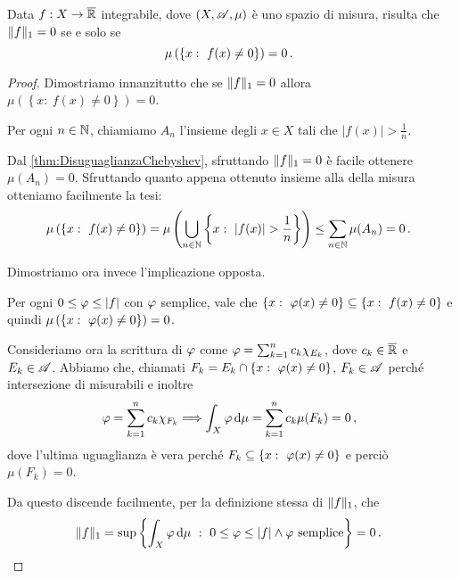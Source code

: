 \begin{lemma}\label{lemma:L1NullaAlloraNulla}
	Data $f:X\to\overline{\mathbb R}$ integrabile, dove $(X,\mathscr A,\mu)$ è uno spazio di misura, risulta che $\Vert f\Vert_1=0$ se e solo se
	\begin{equation*}
		\mu\left(\left\{x:\ f(x)\not=0\right\}\right)=0\punto
	\end{equation*}
\end{lemma}
\begin{proof}
	Dimostriamo innanzitutto che se $\Vert f\Vert_1=0$ allora $\mu\left(\left\{x:\ f(x)\not=0\right\}\right)=0$.

	Per ogni $n\in\mathbb N$, chiamiamo $A_n$ l'insieme degli $x\in X$ tali che $|f(x)|>\frac 1n$.
	
	Dal \cref{thm:DisuguaglianzaChebyshev}, sfruttando $\Vert f\Vert_1=0$ è facile ottenere $\mu(A_n)=0$. 
	Sfruttando quanto appena ottenuto insieme alla \sigsubadd[ità] della misura otteniamo facilmente la tesi:
	\begin{equation*}
		\mu\left(\left\{x:\ f(x)\not=0\right\}\right)=\mu\left(\bigcup_{n\in\N}\left\{x:\ |f(x)|>\frac1n\right\}\right)\le\sum_{n\in\N}\mu(A_n)=0\punto
	\end{equation*}
	
	Dimostriamo ora invece l'implicazione opposta.
	
	Per ogni $0\le \varphi \le |f|$ con $\varphi$ semplice, vale che $\left\{x:\ \simp(x)\not=0\right\}\subseteq\left\{x:\ f(x)\not=0\right\}$ e quindi $\mu\left(\left\{x:\ \simp(x)\not=0\right\}\right)=0$. 
	
	Consideriamo ora la scrittura di $\varphi$ come $\varphi=\sum_{k=1}^n c_k\chi_{E_k}$, dove $c_k\in\overline{\mathbb R}$ e $E_k\in\mathscr A$. Abbiamo che, chiamati $F_k=E_k\cap \left\{x:\ \simp(x)\not=0\right\}$, $F_k\in\mathscr A$ perché intersezione di misurabili e inoltre 
	\begin{equation*}
		\varphi=\sum_{k=1}^n c_k\chi_{F_k} \Longrightarrow \int_X\varphi\,\mathrm d\mu=\sum_{k=1}^n c_k\mu(F_k)=0\, \text{, }
	\end{equation*}
	dove l'ultima uguaglianza è vera perché $F_k\subseteq \left\{x:\ \simp(x)\not=0\right\}$ e perciò $\mu(F_k)=0$.
	
	Da questo discende facilmente, per la definizione stessa di $\Vert f\Vert_1$, che
	\begin{equation*}
		\Vert f\Vert_1=\sup\left\{ \int_X \varphi\,\mathrm d\mu\ :\ 0\le \varphi \le |f| \wedge \varphi \text{ semplice}\right\}=0\, \text{. }
	\end{equation*}
\end{proof}

